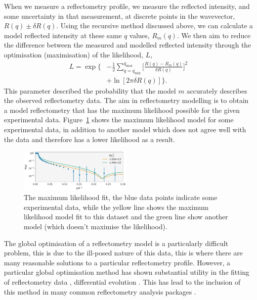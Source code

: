 \documentclass[
 reprint,
 superscriptaddress,
 amsmath,amssymb,
 aps,
]{revtex4-1}
\begin{document}
When we measure a reflectometry profile, we measure the reflected intensity, and some uncertainty in that measurement, at discrete points in the wavevector, $R(q) \pm \delta R(q)$. 
Using the recursive method discussed above, we can calculate a model reflected intensity at these same $q$ values, $R_m(q)$. 
We then aim to reduce the difference between the measured and modelled reflected intensity through the optimisation (maximisation) of the likelihood, $L$, 
%
\begin{equation}
    \begin{aligned}
        L = \exp\bigg\{ & - \frac{1}{2} \sum_{q=q_{\text{min}}}^{q_{\text{max}}} \bigg[\frac{R(q) - R_m(q)}{\delta R(q)}\bigg]^2 \\
         & + \ln[2\pi \delta R(q)]\bigg\}.
    \end{aligned}
\end{equation}
%
This parameter described the probability that the model $m$ accurately describes the observed reflectometry data. 
The aim in reflectometry modelling is to obtain a model reflectometry that has the maximum likelihood possible for the given experimental data. 
Figure~\ref{fig:likelihood} shows the maximum likelihood model for some experimental data, in addition to another model which does not agree well with the data and therefore has a lower likelihood as a result. 
%
\begin{figure}[t]
    \includegraphics[width=0.49\textwidth]{likelihood}
    \caption{The maximum likelihood fit, the blue data points indicate some experimental data, while the yellow line shows the maximum likelihood model fit to this dataset and the green line show another model (which doesn't maximise the likelihood).}
    \label{fig:likelihood}
\end{figure}
%

The global optimisation of a reflectometry model is a particularly difficult problem, this is due to the ill-posed nature of this data, this is where there are many reasonable solutions to a particular reflectometry profile.
However, a particular global optimisation method has shown substantial utility in the fitting of reflectometry data \cite{varderlee_comparison_2007}, differential evolution \cite{wormington_characterization_1999}.
This has lead to the inclusion of this method in many common reflectometry analysis packages \cite{bjorck_fitting_2011}.
\end{document}
